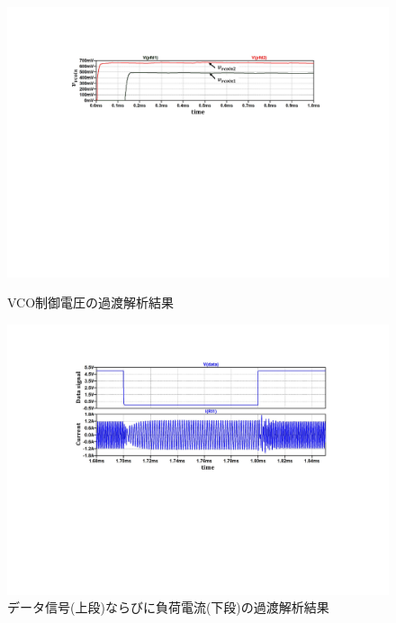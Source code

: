 \begin{figure}[H]
\begin{center}

\includegraphics[width=130mm]{figures/fsksimulationgraph1.pdf}
\caption{VCO制御電圧の過渡解析結果}
\label{fsksimulationgraph1}

\vspace{3mm}

\includegraphics[width=130mm]{figures/fsksimulationgraph2.pdf}
\caption{データ信号(上段)ならびに負荷電流(下段)の過渡解析結果}
\label{fsksimulationgraph2}

\end{center}
\end{figure}

